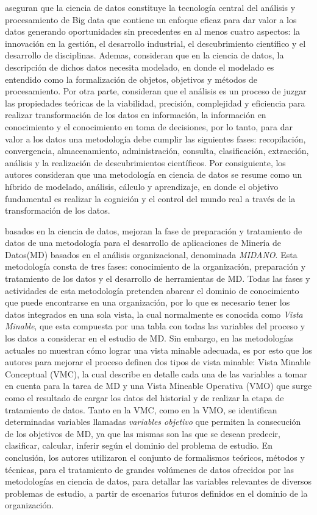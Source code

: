\cite{Xu2021} aseguran que la ciencia de datos constituye la tecnología central del análisis y procesamiento de Big data que contiene un enfoque eficaz para dar valor a los datos generando oportunidades sin precedentes en al menos cuatro aspectos: la innovación en la gestión, el desarrollo industrial, el descubrimiento científico y el desarrollo de disciplinas. Ademas, consideran que en la ciencia de datos, la descripción de dichos datos necesita modelado, en donde el modelado es entendido como la formalización de objetos, objetivos y métodos de procesamiento. Por otra parte, consideran que el análisis es un proceso de juzgar las propiedades teóricas de la viabilidad, precisión, complejidad y eficiencia para realizar transformación de los datos en información, la información en conocimiento y  el conocimiento en toma de decisiones, por lo tanto, para dar valor a los datos una metodología debe cumplir las siguientes fases: recopilación, convergencia, almacenamiento, administración, consulta, clasificación, extracción, análisis  y la realización de descubrimientos científicos. Por consiguiente, los autores consideran que una  metodología en ciencia de datos se resume como un híbrido de modelado, análisis, cálculo y aprendizaje, en donde el objetivo fundamental es realizar la cognición y el control del mundo real a través de  la transformación de los datos.

\cite{Pacheco2014} basados en la ciencia de datos, mejoran la fase de preparación y tratamiento de datos de una metodología para el desarrollo de aplicaciones de Minería de Datos(MD) basados en el análisis organizacional, denominada \textit{MIDANO}. Esta metodología consta de tres fases: conocimiento de la organización,  preparación y tratamiento de los datos y el desarrollo de herramientas de MD. Todas las fases y actividades de esta metodología pretenden abarcar el dominio de conocimiento que puede encontrarse en una organización, por lo que es necesario tener los datos integrados en una sola vista, la cual normalmente es conocida como \textit{Vista Minable}, que esta compuesta por una tabla con todas las variables del proceso y los datos a considerar en el estudio de MD. Sin embargo, en las metodologías actuales no muestran cómo lograr una vista minable adecuada, es por esto que los autores para mejorar el proceso definen dos tipos de vista minable: Vista Minable Conceptual (VMC), la cual describe en detalle cada una de las variables a tomar en cuenta para la tarea de MD  y una Vista Mineable Operativa (VMO) que surge como el resultado de cargar los datos del historial y de realizar la etapa de tratamiento de datos. Tanto en la VMC, como en la VMO, se identifican determinadas variables llamadas \textit{variables objetivo} que permiten la consecución de los objetivos de MD, ya que las mismas son las que se desean predecir, clasificar, calcular, inferir según el dominio del problema de estudio. En conclusión, los autores utilizaron el conjunto de formalismos teóricos, métodos y técnicas, para el tratamiento de grandes volúmenes de datos ofrecidos por las metodologías en ciencia de datos, para detallar las variables relevantes de diversos problemas de estudio, a partir de escenarios futuros definidos en el dominio de la organización.

